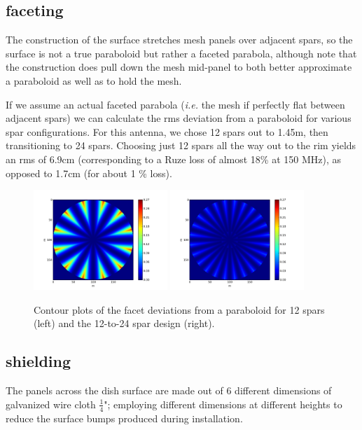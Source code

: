 \documentclass[preprint]{aastex}  %
\begin{document}
\subsection{faceting}
The construction of the surface stretches mesh panels over adjacent spars, so the surface is not a true paraboloid but rather a faceted parabola, although note that the construction does pull down the mesh mid-panel to both better approximate a paraboloid as well as to hold the mesh.

If we assume an actual faceted parabola ({\em i.e.} the mesh if perfectly flat between adjacent spars) we can calculate the rms deviation from a paraboloid for various spar configurations.  For this antenna, we chose 12 spars out to 1.45m, then transitioning to 24 spars.  Choosing just 12 spars all the way out to the rim yields an rms of 6.9cm (corresponding to a Ruze loss of almost 18\% at 150 MHz), as opposed to 1.7cm (for about 1 \% loss).

\begin{figure}[H]
	\begin{center}
	\includegraphics[width =0.45\textwidth]{dish_plots/12spar.png}
	\includegraphics[width = 0.45\textwidth]{dish_plots/special_spar.png}
	\caption{Contour plots of the facet deviations from a paraboloid for 12 spars (left) and the 12-to-24 spar design (right).
\label{Fig:facets} }
	\end{center}
\end{figure}

\subsection{shielding}
The panels across the dish surface are made out of 6 different dimensions of galvanized wire cloth $\frac{1}{4}$"; employing different dimensions at different heights to reduce the surface bumps produced during installation.
\end{document}
